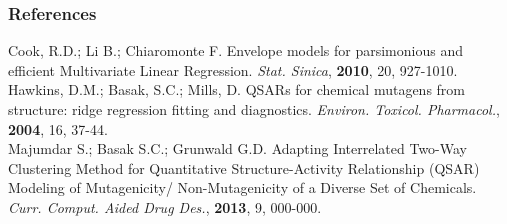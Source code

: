 \documentclass[handout,10pt]{beamer}
\begin{document}
\begin{frame}
\frametitle{References}
\hspace{.2cm}Cook, R.D.; Li B.; Chiaromonte F. Envelope models for parsimonious and efficient Multivariate Linear Regression. \textit{Stat. Sinica}, \textbf{2010}, 20, 927-1010.\\
\vspace{.2cm}
\hspace{.2cm}Hawkins, D.M.; Basak, S.C.; Mills, D. QSARs for chemical mutagens from structure: ridge regression fitting and diagnostics. \textit{Environ. Toxicol. Pharmacol.}, \textbf{2004}, 16, 37-44.\\
\vspace{.2cm}
\hspace{.2cm}Majumdar S.; Basak S.C.; Grunwald G.D. Adapting Interrelated Two-Way Clustering Method for Quantitative 
Structure-Activity Relationship (QSAR) Modeling of Mutagenicity/ Non-Mutagenicity of a Diverse Set of Chemicals. \textit{Curr. Comput. Aided Drug Des.}, \textbf{2013}, 9, 000-000.

\end{frame}
%

\end{document}
